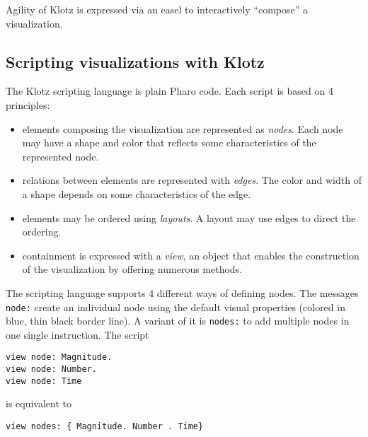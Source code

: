 \documentclass{sig-alternate}
\newcommand{\ct}{\lstinline[backgroundcolor=\color{white},basicstyle=\footnotesize\ttfamily]}
\newcommand{\ab}[1]{\nb{Alexandre}{blue}{#1}}
\newcommand{\seclabel}[1]{\label{sec:#1}}
\begin{document}
Agility of Klotz is expressed via an easel to interactively ``compose'' a visualization.

\subsection{Scripting visualizations with Klotz} \seclabel{scripting}

The Klotz scripting language is plain Pharo code. Each script is based on 4 principles:

\begin{itemize}
\item elements composing the visualization are represented as \emph{nodes}. Each node may have a shape and color that reflects some characteristics of the represented node.
\item relations between elements are represented with \emph{edges}. The color and width of a shape depends on some characteristics of the edge.
\item elements may be ordered using \emph{layouts}. A layout may use edges to direct the ordering.
\item containment is expressed with a \emph{view}, an object that enables the construction of the visualization by offering numerous methods.%
\end{itemize}


The scripting language supports 4 different ways of defining nodes. 
The messages \ct{node:} create an individual node using the default visual properties (colored in blue, thin black border line). A variant of it is \ct{nodes:} to add multiple nodes in one single instruction. The script 

\begin{lstlisting}
view node: Magnitude.
view node: Number.
view node: Time    
\end{lstlisting}

is equivalent to

\begin{lstlisting}
view nodes: { Magnitude. Number . Time}
\end{lstlisting}
\end{document}
